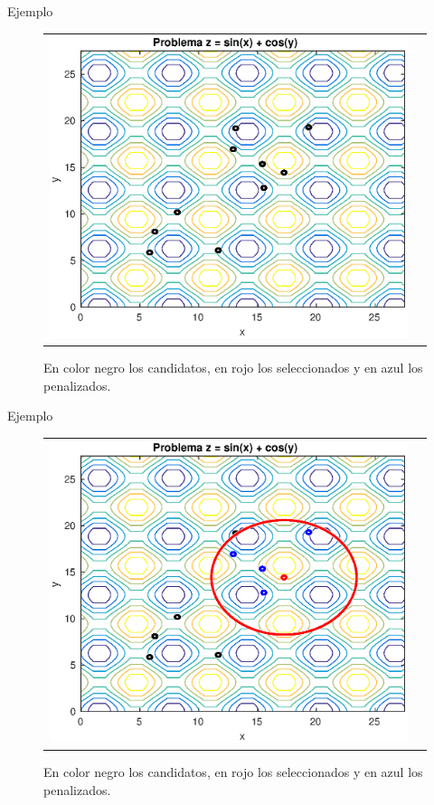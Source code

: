 \documentclass{beamer}
\begin{document}
\begin{frame}{Ejemplo}
\begin{figure}[H]
  \centering
  \begin{tabular}{c c}
   \includegraphics[scale=0.6]{1.eps} 
  \end{tabular}
  \caption{\scriptsize En color negro los candidatos, en rojo los seleccionados y en azul los penalizados.}
\end{figure}
\end{frame}


\begin{frame}{Ejemplo}
\begin{figure}[H]
  \centering
  \begin{tabular}{c c}
   \includegraphics[scale=0.6]{2.eps} 
  \end{tabular}
  \caption{\scriptsize En color negro los candidatos, en rojo los seleccionados y en azul los penalizados.}
\end{figure}
\end{frame}
\end{document}
